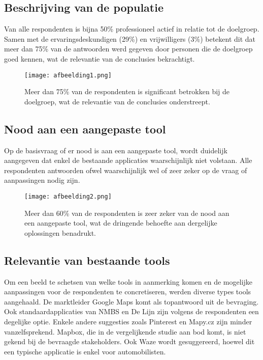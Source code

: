 \subsection*{Beschrijving van de populatie}
Van alle respondenten is bijna 50\% professioneel actief in relatie tot de doelgroep. Samen met de ervaringsdeskundigen (29\%) en vrijwilligers (3\%) betekent dit dat meer dan 75\% van de antwoorden werd gegeven door personen die de doelgroep goed kennen, wat de relevantie van de conclusies bekrachtigt.

\begin{figure}[h]
    \centering
    \texttt{[image: afbeelding1.png]}
    \caption{Meer dan 75\% van de respondenten is significant betrokken bij de doelgroep, wat de relevantie van de conclusies onderstreept.}
    \label{fig:achtergrond}
\end{figure}

\subsection*{Nood aan een aangepaste tool}
Op de basisvraag of er nood is aan een aangepaste tool, wordt duidelijk aangegeven dat enkel de bestaande applicaties waarschijnlijk niet volstaan. Alle respondenten antwoorden ofwel waarschijnlijk wel of zeer zeker op de vraag of aanpassingen nodig zijn.

\begin{figure}[h]
    \centering
    \texttt{[image: afbeelding2.png]}
    \caption{Meer dan 60\% van de respondenten is zeer zeker van de nood aan een aangepaste tool, wat de dringende behoefte aan dergelijke oplossingen benadrukt.}
    \label{fig:inschaling}
\end{figure}

\subsection*{Relevantie van bestaande tools}
Om een beeld te schetsen van welke tools in aanmerking komen en de mogelijke aanpassingen voor de respondenten te concretiseren, werden diverse types tools aangehaald. De marktleider Google Maps komt als topantwoord uit de bevraging. Ook standaardapplicaties van NMBS en De Lijn zijn volgens de respondenten een degelijke optie. Enkele andere suggesties zoals Pinterest en Mapy.cz zijn minder vanzelfsprekend. Mapbox, die in de vergelijkende studie aan bod komt, is niet gekend bij de bevraagde stakeholders. Ook Waze wordt gesuggereerd, hoewel dit een typische applicatie is enkel voor automobilisten.

